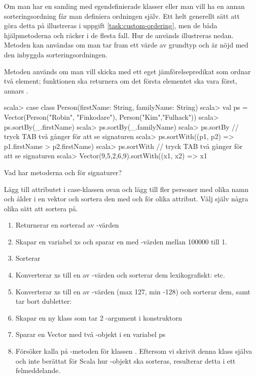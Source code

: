 \Subtask Om man har en samling med egendefinierade klasser eller man vill ha en annan sorteringsordning får man definiera ordningen själv. Ett helt generellt sätt att göra detta på  illustreras i uppgift \ref{task:custom-ordering}, men de båda hjälpmetoderna  och  räcker i de flesta fall. Hur de används illustreras nedan. Metoden  kan användas om man tar fram ett värde av grundtyp och är nöjd med den inbyggda sorteringsordningen.

Metoden  används om man vill skicka med ett eget jämförelsepredikat som ordnar två element; funktionen ska returnera  om det första elementet ska vara först, annars .

\begin{REPL}
scala> case class Person(firstName: String, familyName: String)
scala> val ps = Vector(Person("Robin", "Finkodare"), Person("Kim","Fulhack"))
scala> ps.sortBy(_.firstName)
scala> ps.sortBy(_.familyName)
scala> ps.sortBy  // tryck TAB två gånger för att se signaturen
scala> ps.sortWith((p1, p2) => p1.firstName > p2.firstName)
scala> ps.sortWith  // tryck TAB två gånger för att se signaturen
scala> Vector(9,5,2,6,9).sortWith((x1, x2) => x1 %
\end{REPL}
Vad har metoderna  och  för signaturer?

\Subtask Lägg till attributet  i case-klassen  ovan och lägg till fler personer med olika namn och ålder i en vektor och sortera den med  och  för olika attribut. Välj själv några olika sätt att sortera på.



\SOLUTION


\TaskSolved \what


\SubtaskSolved
\begin{enumerate}
\item Returnerar en sorterad  av -värden
\item Skapar en variabel xs och sparar en  med -värden mellan 100000 till 1.
\item Sorterar 
\item Konverterar xs till en  av -värden och sorterar dem lexikografiskt:  etc.
\item Konverterar xs till en  av -värden (max 127, min -128) och sorterar dem, samt tar bort dubletter: 
\item Skapar en ny klass  som tar 2 -argument i konstruktorn
\item Sparar en Vector med två -objekt i en variabel ps
\item Försöker kalla på -metoden för klassen . Eftersom vi skrivit denna klass själva och inte berättat för Scala hur -objekt ska sorteras, resulterar detta i ett felmeddelande.
\end{enumerate}


